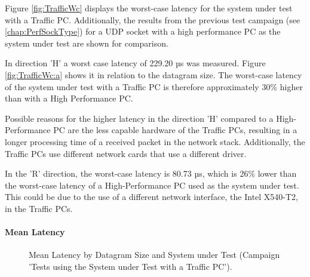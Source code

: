 Figure \ref{fig:TrafficWc} displays the worst-case latency for the system under test with a Traffic PC. Additionally, the results from the previous test campaign (see \ref{chap:PerfSockType}) for a UDP socket with a high performance PC as the system under test are shown for comparison.

In direction 'H' a worst case latency of 229.20 µs was measured. Figure \ref{fig:TrafficWc:a} shows it in relation to the datagram size. The worst-case latency of the system under test with a Traffic PC is therefore approximately 30\% higher than with a High Performance PC.

Possible reasons for the higher latency in the direction 'H' compared to a High-Performance PC are the  less capable hardware of the Traffic PCs, resulting in a longer processing time of a received packet in the network stack. Additionally, the Traffic PCs use different network cards that use a different driver.

In the 'R' direction, the worst-case latency is 80.73 µs, which is 26\% lower than the worst-case latency of a High-Performance PC used as the system under test. This could be due to the use of a different network interface, the Intel X540-T2, in the Traffic PCs.

\paragraph{Mean Latency}
\begin{figure}[h!]
  \centering
  \caption{Mean Latency by Datagram Size and System under Test (Campaign 'Tests using the System under Test with a Traffic PC').}
  \label{fig:TrafficMean}
\end{figure}

